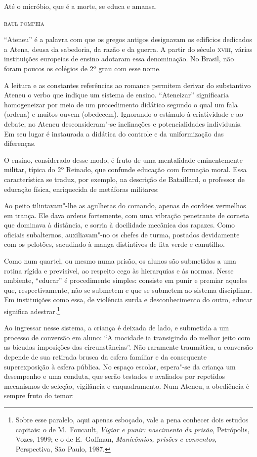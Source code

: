 \epigraph{Até o micróbio, que é a morte, se educa e amansa.}{\textsc{raul pompeia}}

``Ateneu'' é a palavra com que os gregos antigos
designavam os edifícios dedicados a Atena, deusa da sabedoria, da razão
e da guerra. A partir do século \textsc{xviii}, várias instituições europeias de
ensino adotaram essa denominação. No Brasil, não foram poucos os
colégios de 2º grau com esse nome.


A leitura e as constantes referências ao romance permitem derivar do
substantivo Ateneu o verbo que indique um sistema de ensino.
``Ateneizar'' significaria homogeneizar por meio de um
procedimento didático segundo o qual um fala (ordena) e muitos ouvem
(obedecem). Ignorando o estímulo à criatividade e ao debate, no Ateneu
desconsideram"-se inclinações e potencialidades individuais. Em seu
lugar é instaurada a didática do controle e da uniformização das
diferenças.


O ensino, considerado desse modo, é fruto de uma
mentalidade eminentemente militar, típica do
2º Reinado, que confunde educação com formação moral. Essa característica se traduz,
por exemplo, na descrição de Bataillard, o professor de educação
física, enriquecida de metáforas militares: 

\begin{hedraquote}
Ao peito tilintavam"-lhe as agulhetas do comando, apenas de cordões
vermelhos em trança. Ele dava ordens fortemente, com uma vibração
penetrante de corneta que dominava à distância, e sorria à docilidade
mecânica dos rapazes. Como oficiais subalternos, auxiliavam"-no os
chefes de turma, postados devidamente com os pelotões, sacudindo à
manga distintivos de fita verde e canutilho.
\end{hedraquote}

Como num quartel, ou mesmo numa prisão, os alunos são
submetidos a uma rotina rígida e previsível, ao respeito cego às
hierarquias e às normas. Nesse ambiente, ``educar'' é procedimento
simples: consiste em punir e premiar aqueles que, respectivamente, não
se submetem e que se submetem ao sistema disciplinar. Em instituições
como essa, de violência surda e desconhecimento do outro, educar
significa adestrar.\footnote{ Sobre esse paralelo, aqui apenas
esboçado, vale a pena conhecer dois estudos capitais: o de M.~Foucault,
\textit{Vigiar e punir: nascimento da prisão}, Petrópolis, Vozes, 1999; 
e o de E.~Goffman, \textit{Manicômios, prisões e
conventos}, Perspectiva, São Paulo, 1987.}


Ao ingressar nesse sistema, a criança é deixada de lado, e submetida a
um processo de conversão em aluno: ``A mocidade ia transigindo do melhor
jeito com as bicudas imposições das circunstâncias''. Não raramente
traumática, a conversão depende de sua retirada brusca da esfera
familiar e da consequente superexposição à esfera pública. No espaço
escolar, espera"-se da criança um desempenho e uma conduta, que serão
testados e avaliados por repetidos mecanismos de seleção, vigilância e
enquadramento. Num Ateneu, a obediência é sempre fruto do temor:


